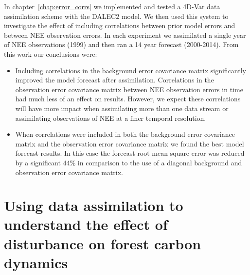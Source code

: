 In chapter~\ref{chap:error_corrs} we implemented and tested a 4D-Var data assimilation scheme with the DALEC2 model. We then used this system to investigate the effect of including correlations between prior model errors and between NEE observation errors. In each experiment we assimilated a single year of NEE observations (1999) and then ran a 14 year forecast (2000-2014). From this work our conclusions were:
\begin{itemize}
\item Including correlations in the background error covariance matrix significantly improved the model forecast after assimilation. Correlations in the observation error covariance matrix between NEE observation errors in time had much less of an effect on results. However, we expect these correlations will have more impact when assimilating more than one data stream or assimilating observations of NEE at a finer temporal resolution.
\item When correlations were included in both the background error covariance matrix and the observation error covariance matrix we found the best model forecast results. In this case the forecast root-mean-square error was reduced by a significant $44\% $ in comparison to the use of a diagonal background and observation error covariance matrix.
\end{itemize} 


\section{Using data assimilation to understand the effect of disturbance on forest carbon dynamics}

